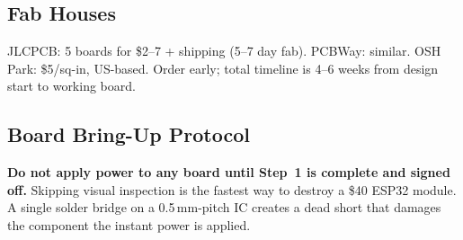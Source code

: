 \subsection{Fab Houses}
JLCPCB: 5 boards for \$2--7 + shipping (5--7 day fab). PCBWay: similar. OSH Park: \$5/sq-in, US-based. Order early; total timeline is 4--6 weeks from design start to working board.

\subsection{Board Bring-Up Protocol}

\begin{warningbox}
\textbf{Do not apply power to any board until Step~1 is complete and signed off.} Skipping visual inspection is the fastest way to destroy a \$40 ESP32 module. A single solder bridge on a 0.5\,mm-pitch IC creates a dead short that damages the component the instant power is applied.
\end{warningbox}

